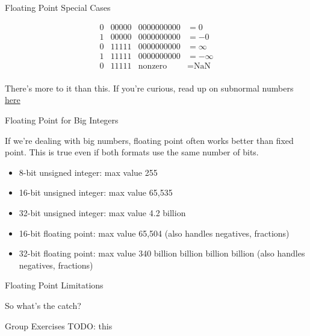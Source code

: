 \begin{frame}{Floating Point Special Cases}

	\[
		\begin{array}{ccccr}
			0 & 00000 & 0000000000     & = 0          \\
			1 & 00000 & 0000000000     & = -0         \\
			0 & 11111 & 0000000000     & = \infty     \\
			1 & 11111 & 0000000000     & = -\infty    \\
			0 & 11111 & \text{nonzero} & = \text{NaN} \\
		\end{array}
	\]

	There's more to it than this. If you're curious, read up on subnormal numbers
	\href{https://en.wikipedia.org/wiki/Half-precision_floating-point_format}{here}

\end{frame}

\begin{frame}{Floating Point for Big Integers}

	If we're dealing with big numbers, floating point often works better than fixed
	point. This is true even if both formats use the same number of bits.

	\begin{itemize}
		\item 8-bit unsigned integer: max value 255
		\item 16-bit unsigned integer: max value 65,535
		\item 32-bit unsigned integer: max value 4.2 billion %
		\item 16-bit floating point: max value 65,504 (also handles negatives, fractions)
		\item 32-bit floating point: max value 340 billion billion billion billion (also handles negatives, fractions)
	\end{itemize}

\end{frame}

\begin{frame}{Floating Point Limitations}

	So what's the catch?

\end{frame}

\begin{frame}{Group Exercises}
TODO: this
\end{frame}



